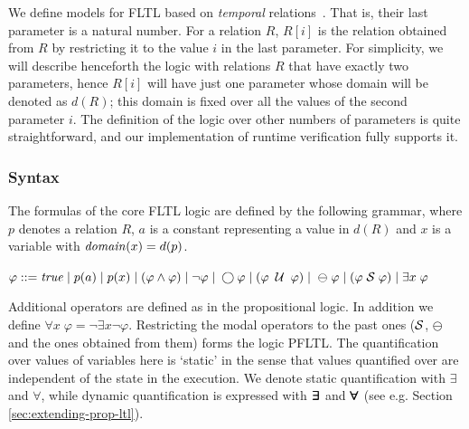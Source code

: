 We define models for FLTL based on {\em temporal} relations~\cite{Chomicki}. That is,
their last parameter
is a natural number. For a relation $R$, $R [ i ]$ is the relation obtained from $R$ by
restricting it to the value $i$ in the last parameter. For simplicity, we will describe henceforth
the logic with relations $R$ that have exactly two parameters, 
hence $R [ i ]$ will have just one parameter whose domain will be denoted as $d ( R )$; this domain is fixed over all the values of the second parameter $i$. The definition of the logic over other numbers of parameters is quite straightforward, and our implementation of runtime verification fully supports it.



\subsubsection{Syntax} 

The formulas of the core FLTL logic are 
defined by the following grammar,
where $p$ denotes a relation $R$,
$a$ is a constant representing a value in $d ( R )$ and $x$ is a variable with $\mathit{domain} ( x ) = d ( p )$.
\begin{center}
$\varphi ::= \mathit{true}  \; | \;
    p ( a ) \; | \;
    p ( x ) \; | \;
    ( \varphi \wedge \varphi ) \;  |   \;
   \neg \varphi \; | \;
   \bigcirc \varphi \; | \; 
   ( \varphi \; \mathbin{\mathcal{U}} \; \varphi ) \; | $ %
   $ \ominus \; \varphi \; | \;
    ( \varphi  \; {\cal S}  \; \varphi ) \; | \;
    \exists x \; \varphi$
\end{center}


\noindent 

Additional operators are defined as in the propositional logic. In addition we define
$\forall x \; \varphi = \neg \exists x \neg \varphi$.
Restricting the modal operators to the past ones
(${\cal S}$, $\ominus$ and the ones obtained from them) 
forms the logic PFLTL.
The quantification over values of variables here is `static' in the sense that values quantified over are independent of the state in the execution. We
denote static quantification with $\exists$ and $\forall$, while
dynamic quantification is expressed with $\bm{\exists}\kern-0.6em\bm{\exists}$ and $\bm{\forall}\kern-0.6em\bm{\forall}$
(see e.g. Section \ref{sec:extending-prop-ltl}).

